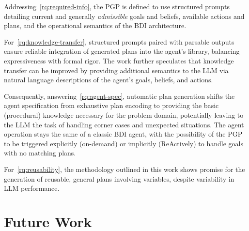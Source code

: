 \documentclass[12pt,a4paper,openright,twoside]{book}
\begin{document}
Addressing~\ref{rq:required-info}, the \ac{PGP} is defined to use structured prompts detailing current and generally \emph{admissible} goals and beliefs, available actions and plans, and the operational semantics of the \ac{BDI} architecture.


For~\ref{rq:knowledge-transfer}, structured prompts paired with parsable outputs ensure reliable integration of generated plans into the agent's library, balancing expressiveness with formal rigor.
%
The work further speculates that knowledge transfer can be improved by providing additional semantics to the \ac{LLM} via natural language descriptions of the agent's goals, beliefs, and actions.

Consequently, answering~\ref{rq:agent-spec}, automatic plan generation shifts the agent specification from exhaustive plan encoding to providing the basic (procedural) knowledge necessary for the problem domain, potentially leaving to the \ac{LLM} the task of handling corner cases and unexpected situations.
%
The agent operation stays the same of a classic \ac{BDI} agent, with the possibility of the \ac{PGP} to be triggered explicitly (on-demand) or implicitly (\ac{ReAct}ively) to handle goals with no matching plans.

For~\ref{rq:reusability}, the methodology outlined in this work shows promise for the generation of reusable, general plans involving variables, despite variability in \ac{LLM} performance.

\section{Future Work}
\end{document}
